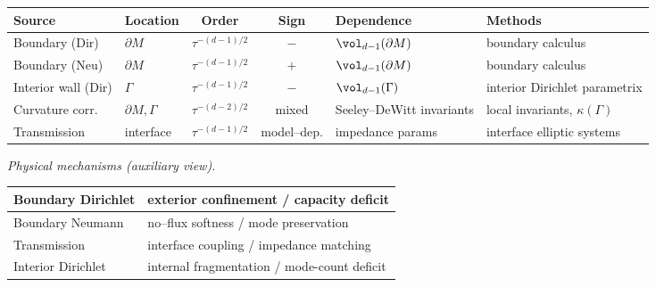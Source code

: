 \begin{center}
\renewcommand{\arraystretch}{1.2}
\begin{tabular}{|l|l|c|c|l|l|}
\hline
\textbf{Source} & \textbf{Location} & \textbf{Order} & \textbf{Sign} & \textbf{Dependence} & \textbf{Methods} \\
\hline
Boundary (Dir) & $\partial M$ & $\tau^{-(d-1)/2}$ & $-$ & $\vol_{d-1}(\partial M)$ & boundary calculus \\
\hline
Boundary (Neu) & $\partial M$ & $\tau^{-(d-1)/2}$ & $+$ & $\vol_{d-1}(\partial M)$ & boundary calculus \\
\hline
Interior wall (Dir) & $\Gamma$ & $\tau^{-(d-1)/2}$ & $-$ & $\vol_{d-1}(\Gamma)$ & interior Dirichlet parametrix \\
\hline
Curvature corr. & $\partial M,\Gamma$ & $\tau^{-(d-2)/2}$ & mixed & Seeley–DeWitt invariants & local invariants, $\kappa(\Gamma)$ \\
\hline
Transmission & interface & $\tau^{-(d-1)/2}$ & model–dep. & impedance params & interface elliptic systems \\
\hline
\end{tabular}
\end{center}

\noindent\textit{Physical mechanisms (auxiliary view).}
\begin{center}
\renewcommand{\arraystretch}{1.05}
\begin{tabular}{|l|l|}
\hline
Boundary Dirichlet & exterior confinement / capacity deficit \\
\hline
Boundary Neumann & no–flux softness / mode preservation \\
\hline
Transmission & interface coupling / impedance matching \\
\hline
Interior Dirichlet & internal fragmentation / mode-count deficit \\
\hline
\end{tabular}
\end{center}

\begin{figure}[t]
\centering
{}
\label{fig:heatloglog}
\end{figure}


